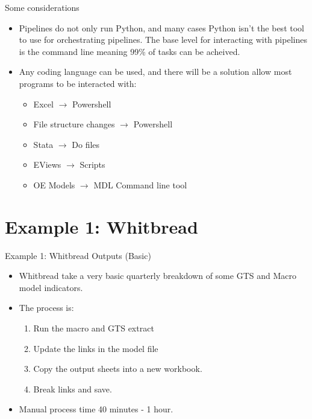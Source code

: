 \documentclass[aspectratio=169]{beamer}
\begin{document}
\begin{frame}{Some considerations}
\begin{itemize}
	\item Pipelines do not only run Python, and many cases Python isn't the best tool to use for orchestrating pipelines. The base level for interacting with pipelines is the command line meaning 99\% of tasks can be acheived.
	\item Any coding language can be used, and there will be a solution allow most programs to be interacted with:
	\begin{itemize}
	\item Excel $\rightarrow$ Powershell
	\item File structure changes $\rightarrow$ Powershell
	\item Stata $\rightarrow$ Do files
	\item EViews $\rightarrow$ Scripts
	\item OE Models $\rightarrow$ MDL Command line tool
	\end{itemize}
\end{itemize}	
\end{frame}



\section{Example 1: Whitbread}

\begin{frame}{Example 1: Whitbread Outputs (Basic)}

\begin{itemize}
	\item Whitbread take a very basic quarterly breakdown of some GTS and Macro model indicators.
	\item The process is:
	\begin{enumerate}
		\item Run the macro and GTS extract
		\item Update the links in the model file
		\item Copy the output sheets into a new workbook. 
		\item Break links and save.
	\end{enumerate}
	\item Manual process time 40 minutes - 1 hour.
\end{itemize}
\end{frame}
\end{document}
